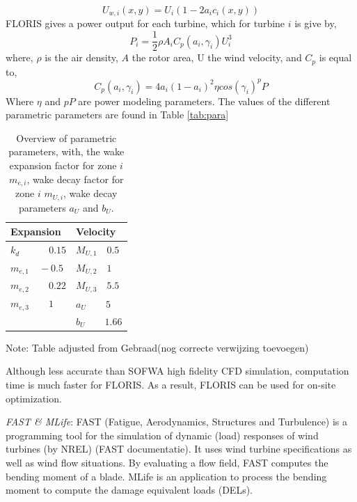 \documentclass[twoside,twocolumn]{article}
\begin{document}
\begin{equation}
\label{eq:Uw}
U_{w,i}(x,y) = U_i\left( {1-2a_ic_i(x,y)} \right)
\end{equation}
 FLORIS gives a power output for each turbine, which for turbine $i$ is give by,
\begin{equation}
\label{eq:P}
P_i = \frac{1}{2} \rho A_i C_p(a_i, \gamma_i)U_i^3
\end{equation}
where, $\rho$ is the air density, $A$ the rotor area, U the wind velocity, and $C_p$ is equal to,
\begin{equation}
\label{eq:Cp}
C_p(a_i, \gamma_i) = 4a_i(1-a_i)^2 \eta cos(\gamma_i)^pP
\end{equation}
Where $\eta$ and $pP$ are power modeling parameters.
The values of the different parametric parameters are found in Table \ref{tab:para}
\begin{table}[h]
	\label{tab:para}
	\caption{Overview of parametric parameters, with, the wake expansion factor for zone $i$ $m_{e,i}$, wake decay factor for zone $i$ $m_{U,i}$, wake decay parameters $a_U$ and $b_U$.}
	\centering
	\label{tab:pars}
	\begin{tabular}{ll}
	\hline
	Expansion & Velocity  \\ 
	\hline
	$k_d \qquad \quad 0.15$ & $M_{U,1} \quad 0.5$ \\
	$m_{e,1} \quad -0.5$ & $M_{U,2} \quad 1$ \\
	$m_{e,2} \qquad 0.22$ & $M_{U,3} \quad 5.5$ \\
	$m_{e,3} \qquad 1$ & $a_U \qquad 5$ \\
	& $b_U \qquad 1.66$ \\
	\hline
	\end{tabular}

Note: Table adjusted from Gebraad(nog correcte verwijzing toevoegen)
\end{table}

 Although less accurate than  SOFWA high fidelity CFD simulation, computation time is much faster for FLORIS. As a result, FLORIS can be used for on-site optimization. 



\textit{FAST \& MLife}: FAST (Fatigue, Aerodynamics, Structures and Turbulence) is a programming tool for the simulation of dynamic (load) responses of wind turbines (by NREL) (FAST documentatie). It uses wind turbine specifications as well as wind flow situations. By evaluating a flow field, FAST computes the bending moment of a blade. MLife is an application to process the bending moment to compute the damage equivalent loads (DELs). 
\end{document}
